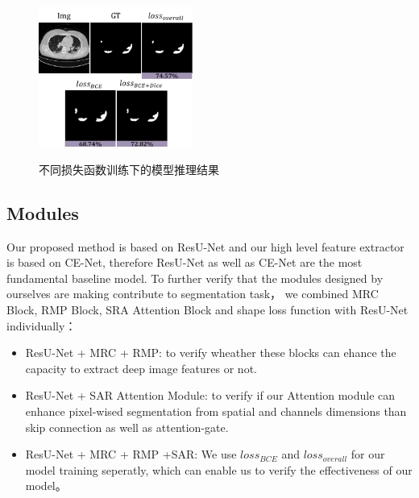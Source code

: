 \documentclass[UTF8]{article} %
\begin{document}
  \begin{figure}[htbp]
    \begin{center}
    \includegraphics[width=0.45\textwidth]{figure/abliation_loss_img.pdf}
    \vspace{-2mm}
    \caption{不同损失函数训练下的模型推理结果} 
    \vspace{-2mm}
    \label{fig:ablation_loss}
    \end{center}
    \vspace{-0.35cm}
  \end{figure}




  \subsection{Modules}
  Our proposed method is based on ResU-Net and our high level feature extractor is based on CE-Net, therefore ResU-Net as well as CE-Net are the most fundamental baseline model.
  To further verify that the modules designed by ourselves are making contribute to segmentation task，
  we combined MRC Block, RMP Block, SRA Attention Block and shape loss function with ResU-Net individually：
  \begin{itemize}
      \item ResU-Net + MRC + RMP: to verify wheather these blocks can ehance the capacity to extract deep image features or not.
      \item ResU-Net + SAR Attention Module: to verify if our Attention module can enhance pixel-wised segmentation from spatial and channels dimensions than skip connection as well as
            attention-gate.
      \item ResU-Net + MRC + RMP +SAR: We use \(loss_{BCE}\) and \(loss_{overall}\) for our model training seperatly, which can enable us to verify the effectiveness of our model。
  \end{itemize}
\end{document}
